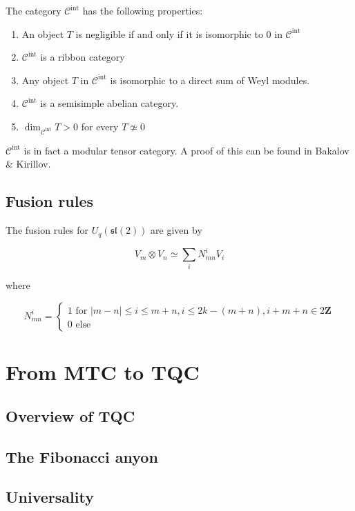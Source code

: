 \documentclass[]{article}
\newcommand{\sll}{\mathfrak{sl}}
\numberwithin{equation}{subsection}
\begin{document}
The category $\mathcal{C}^\text{int}$ has the following properties:
\begin{enumerate}
    \item An object $T$ is negligible if and only if it is isomorphic to 0 in $\mathcal{C}^\text{int}$
    \item  $\mathcal{C}^\text{int}$ is a ribbon category
    \item Any object $T$ in $\mathcal{C}^\text{int}$ is isomorphic to a direct sum of Weyl modules.
    \item $\mathcal{C}^\text{int}$ is a semisimple abelian category. 
    \item $\dim_{\mathcal{C}^\text{int}} T > 0$ for every $T \not\simeq 0$
\end{enumerate}

$\mathcal{C}^\text{int}$ is in fact a modular tensor category. A proof of this
can be found in Bakalov \& Kirillov. %
 
\subsection{Fusion rules}

The fusion rules for $U_q(\sll(2))$ are given by 

\begin{equation}
    V_m \otimes V_n \simeq \sum_i N_{mn}^i V_i
\end{equation}

where 

\begin{equation}
    N_{mn}^i = \begin{cases} 1 \text{ for } |m-n| \leq i \leq m+n, i \leq 2k - (m+n), i + m + n \in 2 \mathbf{Z} \\
                             0 \text{ else } 
               \end{cases}
\end{equation}


\section{From MTC to TQC}
\subsection{Overview of TQC}
\subsection{The Fibonacci anyon}
\subsection{Universality}



\end{document}
